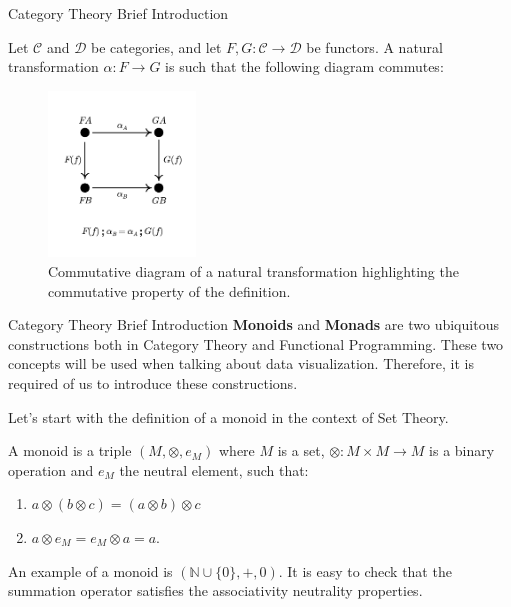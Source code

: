 \documentclass[aspectratio=169,xcolor=dvipsnames,9pt]{beamer}
\begin{document}
\begin{frame}[fragile]{Category Theory Brief Introduction}
	\begin{definition}
		Let $\mathcal C$ and $\mathcal D$ be categories, and let $F,G:\mathcal C \to \mathcal D$ be functors.
		A natural transformation $\alpha: F \to G$ is such that the following diagram commutes:
		\begin{figure}[H]
			\begin{center}
				\includegraphics[width=0.35\textwidth]{./figures/NaturalTransformation.pdf}
			\end{center}
			\caption{Commutative diagram of a natural transformation highlighting the commutative property of the definition.}
			\label{fig:NaturalTransformation}
		\end{figure}
	\end{definition}
\end{frame}

\begin{frame}[fragile]{Category Theory Brief Introduction}
	\textbf{Monoids} and \textbf{Monads} are two ubiquitous constructions both in Category Theory and
	Functional Programming. These two concepts will be used when talking about
	data visualization. Therefore, it is required of us to introduce these constructions.

	Let's start with the definition of a monoid in the context of Set Theory.

	\begin{definition}
		A monoid is a triple $(M, \otimes, e_M)$ where $M$ is a set, $\otimes:M\times M \to M$ is a binary operation
		and $e_M$ the neutral element, such that:
		\begin{enumerate}
			\item $a \otimes (b \otimes c) = (a \otimes b) \otimes c$
			\item $a \otimes e_M = e_M \otimes a = a$.
		\end{enumerate}
		\label{def:monoid}
	\end{definition}

	An example of a monoid is $(\mathbb N \cup \{0\}, +, 0)$.
	It is easy to check that the summation operator satisfies the
	associativity neutrality properties.
\end{frame}
\end{document}
